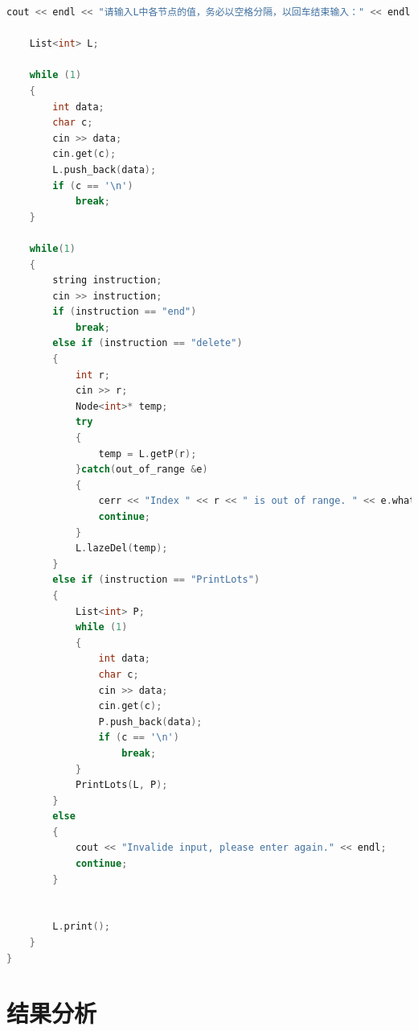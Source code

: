 \documentclass[UTF8]{ctexart}
\begin{document}
\begin{lstlisting}[language=C++,caption={list\_ADT代码},label={vec_code}]
    cout << endl << "请输入L中各节点的值，务必以空格分隔，以回车结束输入：" << endl;

    List<int> L;

    while (1)
    {
        int data;
        char c;
        cin >> data;
        cin.get(c);
        L.push_back(data);
        if (c == '\n')
            break;
    }
  
    while(1)
    {
        string instruction;
        cin >> instruction;
        if (instruction == "end")
            break;
        else if (instruction == "delete")
        {
            int r;
            cin >> r;
            Node<int>* temp;
            try
            {
                temp = L.getP(r);
            }catch(out_of_range &e)
            {
                cerr << "Index " << r << " is out of range. " << e.what() << endl;
                continue;
            }
            L.lazeDel(temp);
        }
        else if (instruction == "PrintLots")
        {
            List<int> P;
            while (1)
            {
                int data;
                char c;
                cin >> data;
                cin.get(c);
                P.push_back(data);
                if (c == '\n')
                    break;
            }
            PrintLots(L, P);
        }
        else
        {
            cout << "Invalide input, please enter again." << endl;
            continue;
        }
        

        L.print();
    }
}
	\end{lstlisting}
	
	\section{结果分析}
\end{document}
